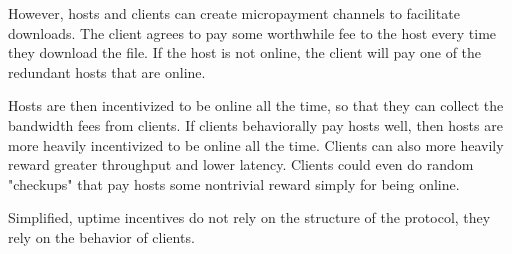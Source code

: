 \documentclass[twocolumn]{article}
\begin{document}
However, hosts and clients can create micropayment channels to facilitate downloads.
The client agrees to pay some worthwhile fee to the host every time they download the file.
If the host is not online, the client will pay one of the redundant hosts that are online.

Hosts are then incentivized to be online all the time, so that they can collect the bandwidth fees from clients.
If clients behaviorally pay hosts well, then hosts are more heavily incentivized to be online all the time.
Clients can also more heavily reward greater throughput and lower latency.
Clients could even do random "checkups" that pay hosts some nontrivial reward simply for being online.

Simplified, uptime incentives do not rely on the structure of the protocol, they rely on the behavior of clients.

%


\end{document}
